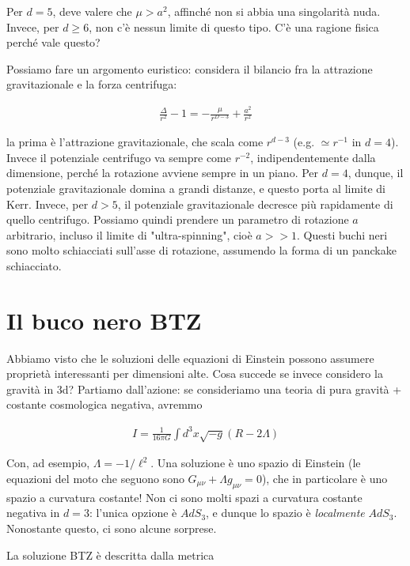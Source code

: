 \documentclass{report}
\begin{document}
Per \(d=5\), deve valere che \(\mu > a^2\), affinché non si abbia una singolarità nuda. Invece, per \(d \geq 6\), non c'è nessun limite di questo tipo. C'è una ragione fisica perché vale questo? 

Possiamo fare un argomento euristico: considera il bilancio fra la attrazione gravitazionale e la forza centrifuga: 

\begin{align}
    \frac{\Delta}{r^2}-1 = -\frac{\mu}{r^{D-3}} + \frac{a^2}{r^2}
\end{align}

la prima è l'attrazione gravitazionale, che scala come \(r^{d-3}\) (e.g. \(\simeq r^{-1}\) in \(d=4\)). Invece il potenziale centrifugo va sempre come \(r^{-2}\), indipendentemente dalla dimensione, perché la rotazione avviene sempre in un piano. Per \(d=4\), dunque, il potenziale gravitazionale domina a grandi distanze, e questo porta al limite di Kerr. Invece, per \(d > 5\), il potenziale gravitazionale decresce più rapidamente di quello centrifugo. Possiamo quindi prendere un parametro di rotazione \(a\) arbitrario, incluso il limite di "ultra-spinning", cioè \(a >> 1\). Questi buchi neri sono molto schiacciati sull'asse di rotazione, assumendo la forma di un panckake schiacciato. 

\section{Il buco nero BTZ}

Abbiamo visto che le soluzioni delle equazioni di Einstein possono assumere proprietà interessanti per dimensioni alte. Cosa succede se invece considero la gravità in 3d? Partiamo dall'azione: se consideriamo una teoria di pura gravità + costante cosmologica negativa, avremmo 

\begin{align}
    I = \frac{1}{16\pi G}\int d^3x \sqrt{-g}(R-2\Lambda)
\end{align}

Con, ad esempio, \(\Lambda = -1/\ell^2\). Una soluzione è uno spazio di Einstein (le equazioni del moto che seguono sono \(G_{\mu\nu} + \Lambda g_{\mu\nu} = 0\)), che in particolare è uno spazio a curvatura costante! Non ci sono molti spazi a curvatura costante negativa in \(d=3\): l'unica opzione è \(AdS_3\), e dunque lo spazio è \emph{localmente} \(AdS_3\). Nonostante questo, ci sono alcune sorprese. 

La soluzione BTZ è descritta dalla metrica 
\end{document}
